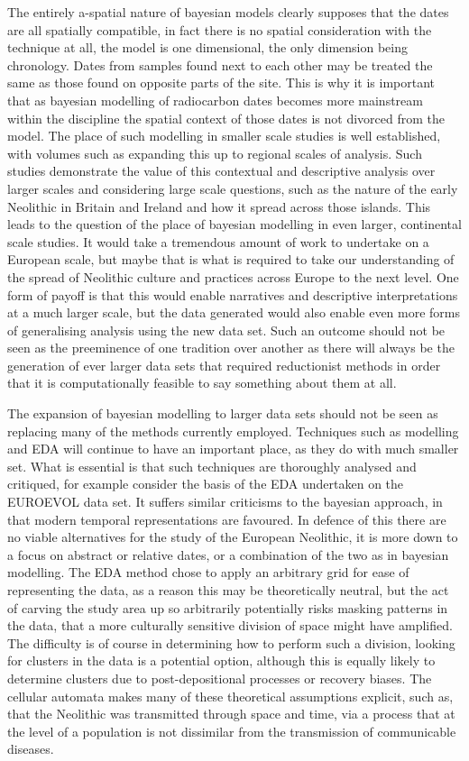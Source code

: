 The entirely a-spatial nature of bayesian models clearly supposes that the dates are all spatially compatible, in fact there is no spatial consideration with the technique at all, the model is one dimensional, the only dimension being chronology. Dates from samples found next to each other may be treated the same as those found on opposite parts of the site. This is why it is important that as bayesian modelling of radiocarbon dates becomes more mainstream within the discipline the spatial context of those dates is not divorced from the model. The place of such modelling in smaller scale studies is well established, with volumes such as \citet{Whittle:2011kl,Whittle:2011tg} expanding this up to regional scales of analysis. Such studies demonstrate the value of this contextual and descriptive analysis over larger scales and considering large scale questions, such as the nature of the early Neolithic in Britain and Ireland and how it spread across those islands. This leads to the question of the place of bayesian modelling in even larger, continental scale studies. It would take a tremendous amount of work to undertake on a European scale, but maybe that is what is required to take our understanding of the spread of Neolithic culture and practices across Europe to the next level. One form of payoff is that this would enable narratives and descriptive interpretations at a much larger scale, but the data generated would also enable even more forms of generalising analysis using the new data set. Such an outcome should not be seen as the preeminence of one tradition over another as there will always be the generation of ever larger data sets that required reductionist methods in order that it is computationally feasible to say something about them at all.

The expansion of bayesian modelling to larger data sets should not be seen as replacing many of the methods currently employed. Techniques such as modelling and EDA will continue to have an important place, as they do with much smaller set. What is essential is that such techniques are thoroughly analysed and critiqued, for example consider the basis of the EDA undertaken on the EUROEVOL data set. It suffers similar criticisms to the bayesian approach, in that modern temporal representations are favoured. In defence of this there are no viable alternatives for the study of the European Neolithic, it is more down to a focus on abstract or relative dates, or a combination of the two as in bayesian modelling. The EDA method chose to apply an arbitrary grid for ease of representing the data, as a reason this may be theoretically neutral, but the act of carving the study area up so arbitrarily potentially risks masking patterns in the data, that a more culturally sensitive division of space might have amplified. The difficulty is of course in determining how to perform such a division, looking for clusters in the data is a potential option, although this is equally likely to determine clusters due to post-depositional processes or recovery biases. The cellular automata makes many of these theoretical assumptions explicit, such as, that the Neolithic was transmitted through space and time, via a process that at the level of a population is not dissimilar from the transmission of communicable diseases. 

